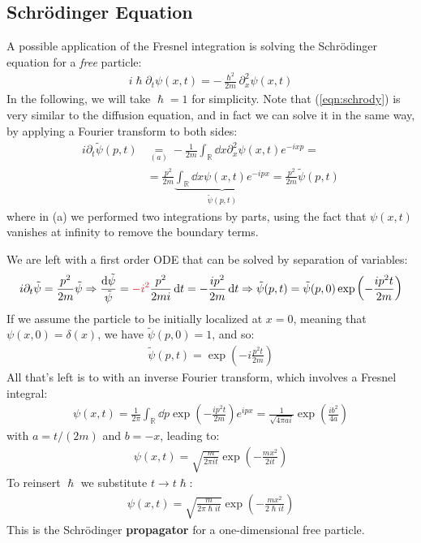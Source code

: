 \documentclass[../template.tex]{subfiles}
\begin{document}
\subsection{Schr\"odinger Equation}
A possible application of the Fresnel integration is solving the Schr\"odinger equation for a \textit{free} particle:
\begin{align} \label{eqn:schrody}
    i \hslash \partial_t \psi(x,t) = -\frac{\hslash^2}{2m} \partial_x^2 \psi(x,t)   
\end{align} 
In the following, we will take $\hslash = 1$ for simplicity. Note that (\ref{eqn:schrody}) is very similar to the diffusion equation, and in fact we can solve it in the same way, by applying a Fourier transform to both sides:
\begin{align*}
    i \partial_t \tilde{\psi}(p,t) &\underset{(a)}{=}  -\frac{1}{2m} \int_{\mathbb{R}} \dd{x} \partial_x^2 \psi(x,t) e^{-ixp} =\\ 
    &= \frac{p^2}{2m} \underbrace{\int_{\mathbb{R}} \dd{x} \psi(x,t) e^{-ipx}}_{\tilde{\psi}(p,t)}  = \frac{p^2}{2m} \tilde{\psi}(p,t) 
\end{align*}
where in (a) we performed two integrations by parts, using the fact that $\psi(x,t)$ vanishes at infinity to remove the boundary terms.

\medskip

We are left with a first order ODE that can be solved by separation of variables:
\begin{align*}
    i \partial_t \tilde{\psi} = \frac{p^2}{2m} \tilde{\psi} \Rightarrow \frac{\dd{\tilde{\psi}}}{\tilde{\psi}} = \textcolor{Red}{-i^2} \frac{p^2}{2m i} \dd{t} = -\frac{ip^2}{2m} \dd{t} \Rightarrow \tilde{\psi}(p,t) = \tilde{\psi}(p,0) \exp\left(-\frac{ip^2 t}{2m} \right)
\end{align*}
If we assume the particle to be initially localized at $x=0$, meaning that $\psi(x,0) = \delta(x)$, we have $\tilde{\psi}(p,0) = 1$, and so:
\begin{align*}
    \tilde{\psi}(p,t) = \exp\left(-i\frac{p^2 t}{2m} \right)
\end{align*}
All that's left is to  with an inverse Fourier transform, which involves a Fresnel integral:
\begin{align*}
    \psi(x,t) = \frac{1}{2\pi} \int_{\mathbb{R}} \dd{p} \exp\left(-\frac{ip^2 t}{2m} \right) e^{ipx} = \frac{1}{\sqrt{4 \pi a i}} \exp\left(\frac{ib^2}{4a} \right) 
\end{align*}
with $a = t/(2m)$ and $b=-x$, leading to:
\begin{align*} 
    \psi(x,t) = \sqrt{\frac{m}{2 \pi i t}} \exp\left(-\frac{m x^2}{2 i t} \right)
\end{align*}
To reinsert $\hslash$ we substitute $t \to t \hslash$:
\begin{align*}
    \psi(x,t) = \sqrt{\frac{m}{2 \pi \hslash i t}} \exp\left(-\frac{m x^2}{2 \hslash i t} \right)
\end{align*}
This is the Schr\"odinger \textbf{propagator} for a one-dimensional free particle.
\end{document}
